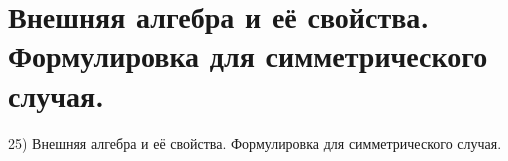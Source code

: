 \section{ Внешняя алгебра и её свойства. Формулировка для симметрического случая.}

25) Внешняя алгебра и её свойства. Формулировка для симметрического случая.
